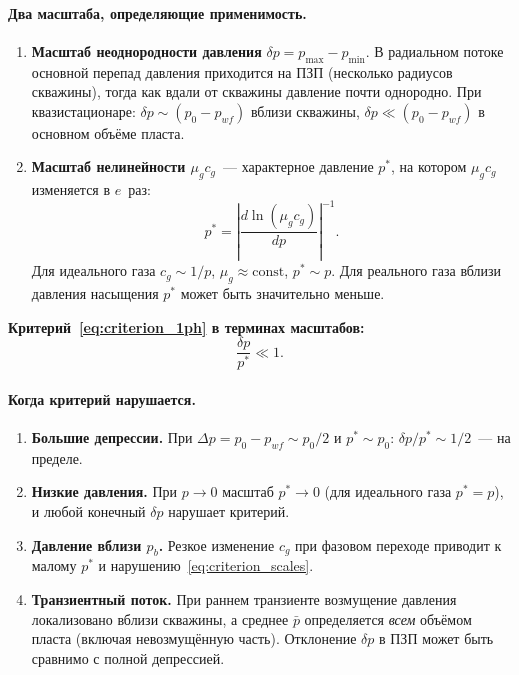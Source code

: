 \documentclass[12pt,a4paper]{article}
\begin{document}
\paragraph{Два масштаба, определяющие применимость.}

\begin{enumerate}
  \item \textbf{Масштаб неоднородности давления}
        $\delta p = p_{\max} - p_{\min}$.
        В радиальном потоке основной перепад давления
        приходится на ПЗП (несколько радиусов скважины),
        тогда как вдали от скважины давление почти однородно.
        При квазистационаре: $\delta p \sim (p_0 - p_{wf})$
        вблизи скважины, $\delta p \ll (p_0 - p_{wf})$
        в основном объёме пласта.

  \item \textbf{Масштаб нелинейности $\mu_g c_g$}~---
        характерное давление $p^*$, на котором $\mu_g c_g$
        изменяется в $e$~раз:
        \begin{equation}\label{eq:p_star}
          p^* = \left|\frac{d\ln(\mu_g c_g)}{dp}
          \right|^{-1}.
        \end{equation}
        Для идеального газа $c_g \sim 1/p$, $\mu_g \approx \mathrm{const}$,
        $p^* \sim p$. Для реального газа вблизи давления
        насыщения $p^*$ может быть значительно меньше.
\end{enumerate}

\noindent
\textbf{Критерий~\eqref{eq:criterion_1ph} в терминах масштабов:}
\begin{equation}\label{eq:criterion_scales}
  \boxed{\frac{\delta p}{p^*} \ll 1.}
\end{equation}

\paragraph{Когда критерий нарушается.}
\begin{enumerate}[nosep]
  \item \textbf{Большие депрессии.}
        При $\Delta p = p_0 - p_{wf} \sim p_0/2$ и $p^* \sim p_0$:
        $\delta p / p^* \sim 1/2$~--- на пределе.
  \item \textbf{Низкие давления.}
        При $p \to 0$ масштаб $p^* \to 0$ (для идеального газа
        $p^* = p$), и любой конечный $\delta p$ нарушает критерий.
  \item \textbf{Давление вблизи $p_b$.}
        Резкое изменение $c_g$ при фазовом переходе приводит
        к малому $p^*$ и нарушению~\eqref{eq:criterion_scales}.
  \item \textbf{Транзиентный поток.}
        При раннем транзиенте возмущение давления локализовано
        вблизи скважины, а среднее $\bar{p}$ определяется
        \emph{всем} объёмом пласта (включая невозмущённую часть).
        Отклонение $\delta p$ в ПЗП может быть сравнимо
        с полной депрессией.
\end{enumerate}
\end{document}

